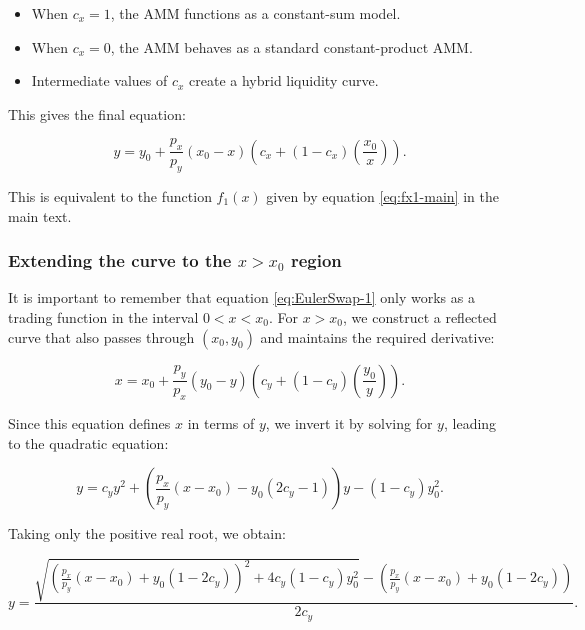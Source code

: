 \documentclass{article}
\begin{document}
\begin{itemize}
    \item When \( c_x = 1 \), the AMM functions as a constant-sum model.
    \item When \( c_x = 0 \), the AMM behaves as a standard constant-product AMM.
    \item Intermediate values of \( c_x \) create a hybrid liquidity curve.
\end{itemize}

This gives the final equation:

\begin{equation}
    \label{eq:EulerSwap-1}
    y = y_0 + \frac{p_x}{p_y} (x_0 - x) \left( c_x + (1 - c_x) \left(\frac{x_0}{x}\right) \right).
\end{equation}

This is equivalent to the function \( f_1(x) \) given by equation \eqref{eq:fx1-main} in the main text.

\subsubsection{Extending the curve to the \( x > x_0 \) region}

It is important to remember that equation \eqref{eq:EulerSwap-1} only works as a trading function in the interval $0 < x < x_0$. For \( x > x_0 \), we construct a reflected curve that also passes through \( (x_0, y_0) \) and maintains the required derivative:

\begin{equation}
    \label{eq:EulerSwap-3-inverse}
    x = x_0 + \frac{p_y}{p_x} (y_0 - y) \left( c_y + (1 - c_y) \left(\frac{y_0}{y}\right) \right).
\end{equation}

Since this equation defines \( x \) in terms of \( y \), we invert it by solving for \( y \), leading to the quadratic equation:

\begin{equation}
    y = c_y y^2 + \left( \frac{p_x}{p_y} (x - x_0) - y_0(2c_y - 1) \right)y - (1 - c_y) y_0^2.
\end{equation}

Taking only the positive real root, we obtain:

\begin{equation}
    \label{eq:EulerSwap-2}
    y = \frac{
        \sqrt{
            \left( \frac{p_x}{p_y} (x - x_0) + y_0 (1 - 2c_y) \right)^2 
            + 4c_y (1 - c_y) y_0^2
        } 
        - \left( \frac{p_x}{p_y} (x - x_0) + y_0 (1 - 2c_y) \right)
    }{2c_y}.
\end{equation}
\end{document}
